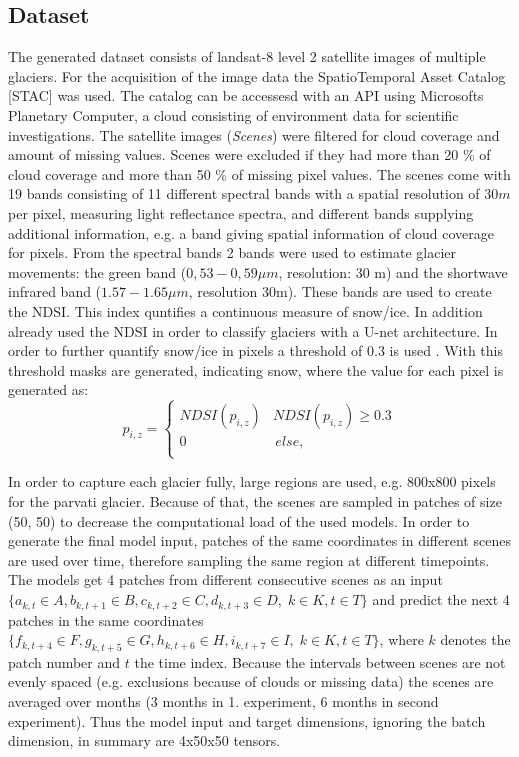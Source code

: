 \documentclass[12pt]{article}
\begin{document}
\subsection{Dataset}
The generated dataset consists of landsat-8 level 2 satellite images of multiple glaciers. For the acquisition of the image data the SpatioTemporal Asset Catalog [STAC] was used. The catalog can be accessesd with an API using Microsofts Planetary Computer, a cloud consisting of environment data for scientific investigations. The satellite images (\textit{Scenes}) were filtered for cloud coverage and amount of missing values. Scenes were excluded if they had more than 20 \% of cloud coverage and more than 50 \% of missing pixel values. The scenes come with 19 bands consisting of 11 different spectral bands with a spatial resolution of $30m$ per pixel, measuring light reflectance spectra, and different bands supplying additional information, e.g. a band giving spatial information of cloud coverage for pixels. From the spectral bands 2 bands were used to estimate glacier movements: the green band ($0,53-0,59 \mu m $, resolution: 30 m) and the shortwave infrared band ($1.57-1.65 \mu m$, resolution 30m). These bands are used to create the NDSI. This index quntifies a continuous measure of snow/ice. In addition \citet{he2020glacier} already used the NDSI in order to classify glaciers with a U-net architecture. In order to further quantify snow/ice in pixels a threshold of 0.3 is used \citep{vonica2021glacier}. With this threshold masks are generated, indicating snow, where the value for each pixel is generated as:
	$$
	 p_{i,z} = \left\{
	\begin{array}{ll}
		NDSI(p_{i,z}) & NDSI(p_{i,z}) \geq 0.3 \\
		0 & \, else,  \\
	\end{array}
	\right. $$
	

	
 In order to capture each glacier fully, large regions are used, e.g. 800x800 pixels for the parvati glacier. Because of that, the scenes are sampled in patches of size (50, 50) to decrease the computational load of the used models. In order to generate the final model input, patches of the same coordinates in different scenes are used over time, therefore sampling the same region at different timepoints. The models get 4 patches from different consecutive scenes as an input
 $\{a_{k, t} \in A, b_{k, t+1} \in B, c_{k, t+2} \in C, d_{k, t+3} \in D, \;  k \in K,  t \in T\}$ and predict the next 4 patches in the same coordinates $\{f_{k, t+4} \in F, g_{k, t+5} \in G, h_{k, t+6} \in H, i_{k, t+7} \in I,\;  k \in K,  t \in T \}$, where $k$ denotes the patch number and $t$ the time index.  Because the intervals between scenes are not evenly spaced (e.g. exclusions because of clouds or missing data) the scenes are averaged over months (3 months in 1. experiment, 6 months in second experiment). Thus the model input and target dimensions, ignoring the batch dimension, in summary are 4x50x50 tensors.
 
\end{document}
